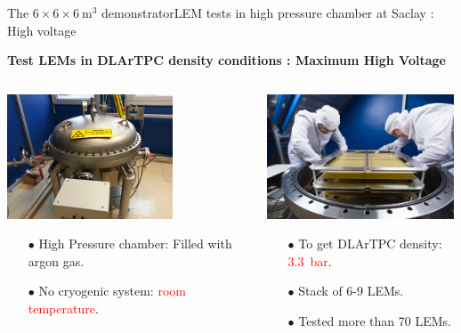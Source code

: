 \documentclass[10pt]{beamer}
\begin{document}
    \begin{frame}{The \texorpdfstring{$6 \times 6 \times \SI{6}{\meter\cubed}$}{666} demonstrator}{LEM tests in high pressure chamber at Saclay : High voltage}
    	\begin{scriptsize}
    		\begin{center}\textbf{Test LEMs in DLArTPC density conditions : Maximum High Voltage}\end{center}
    		\begin{columns}
		    	\begin{column}{0.5\textwidth}
		    		\includegraphics[height=3.7cm]{figures/666/gamelle.jpg}\\
		    		\begin{itemize}
		    			\item[$\bullet$] High Pressure chamber: Filled with argon gas.
		    			\item[$\bullet$] No cryogenic system: \textcolor{red}{room temperature}.
		    		\end{itemize}
		    	\end{column}\hfill
		    	\begin{column}{0.5\textwidth}
		    		\includegraphics[height=3.7cm]{figures/666/6lems_gamelle.jpg}\\
		    		\begin{itemize}
		    			\item[$\bullet$] To get DLArTPC density: \textcolor{red}{\SI{3.3}{\bar}}.
		    			\item[$\bullet$] Stack of 6-9 LEMs.
		    			\item[$\bullet$] Tested more than 70 LEMs.
		    		\end{itemize}
		    	\end{column}
		    \end{columns}
	    \end{scriptsize} 
    \end{frame}
    
\end{document}
